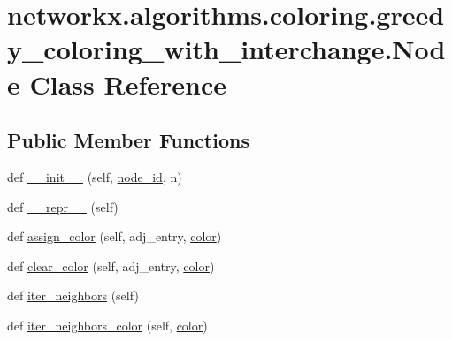\hypertarget{classnetworkx_1_1algorithms_1_1coloring_1_1greedy__coloring__with__interchange_1_1Node}{}\section{networkx.\+algorithms.\+coloring.\+greedy\+\_\+coloring\+\_\+with\+\_\+interchange.\+Node Class Reference}
\label{classnetworkx_1_1algorithms_1_1coloring_1_1greedy__coloring__with__interchange_1_1Node}
\subsection*{Public Member Functions}
\begin{DoxyCompactItemize}
\item 
def \hyperlink{classnetworkx_1_1algorithms_1_1coloring_1_1greedy__coloring__with__interchange_1_1Node_aea4a33a355a8f70fb389bffddef27517}{\+\_\+\+\_\+init\+\_\+\+\_\+} (self, \hyperlink{classnetworkx_1_1algorithms_1_1coloring_1_1greedy__coloring__with__interchange_1_1Node_a2002c3931dc32e43e7f7794dbc784cea}{node\+\_\+id}, n)
\item 
def \hyperlink{classnetworkx_1_1algorithms_1_1coloring_1_1greedy__coloring__with__interchange_1_1Node_ab29f1be91e105069345cb010c7904d46}{\+\_\+\+\_\+repr\+\_\+\+\_\+} (self)
\item 
def \hyperlink{classnetworkx_1_1algorithms_1_1coloring_1_1greedy__coloring__with__interchange_1_1Node_ad238eaf56901a82f61d118fe08b9235a}{assign\+\_\+color} (self, adj\+\_\+entry, \hyperlink{classnetworkx_1_1algorithms_1_1coloring_1_1greedy__coloring__with__interchange_1_1Node_ad96e88ded38077079700b2104a854ae2}{color})
\item 
def \hyperlink{classnetworkx_1_1algorithms_1_1coloring_1_1greedy__coloring__with__interchange_1_1Node_a042d73a8ce785b8acf28f26c5aeb876b}{clear\+\_\+color} (self, adj\+\_\+entry, \hyperlink{classnetworkx_1_1algorithms_1_1coloring_1_1greedy__coloring__with__interchange_1_1Node_ad96e88ded38077079700b2104a854ae2}{color})
\item 
def \hyperlink{classnetworkx_1_1algorithms_1_1coloring_1_1greedy__coloring__with__interchange_1_1Node_a9851689c6b8bdf45d5471b53af5a540b}{iter\+\_\+neighbors} (self)
\item 
def \hyperlink{classnetworkx_1_1algorithms_1_1coloring_1_1greedy__coloring__with__interchange_1_1Node_a2b09342f1beba43df0de4c3b59914a32}{iter\+\_\+neighbors\+\_\+color} (self, \hyperlink{classnetworkx_1_1algorithms_1_1coloring_1_1greedy__coloring__with__interchange_1_1Node_ad96e88ded38077079700b2104a854ae2}{color})
\end{DoxyCompactItemize}
